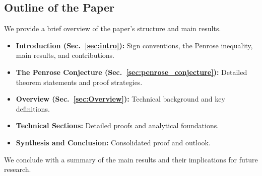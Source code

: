 \subsection{Outline of the Paper}\label{sec:Outline}

We provide a brief overview of the paper's structure and main results.

\begin{itemize}
    \item \textbf{Introduction (Sec.~\ref{sec:intro}):} Sign conventions, the Penrose inequality, main results, and contributions.
    \item \textbf{The Penrose Conjecture (Sec.~\ref{sec:penrose_conjecture}):} Detailed theorem statements and proof strategies.
    \item \textbf{Overview (Sec.~\ref{sec:Overview}):} Technical background and key definitions.
    \item \textbf{Technical Sections:} Detailed proofs and analytical foundations.
    \item \textbf{Synthesis and Conclusion:} Consolidated proof and outlook.
\end{itemize}

We conclude with a summary of the main results and their implications for future research.
